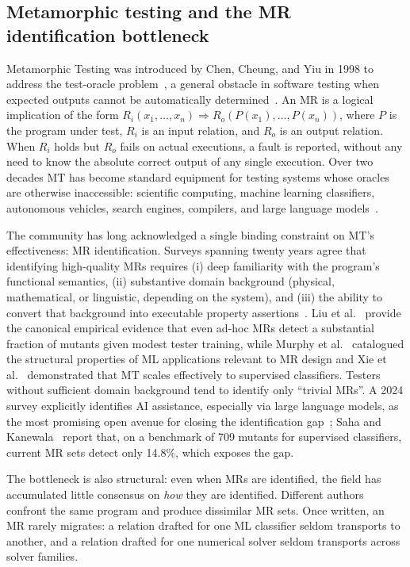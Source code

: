 \documentclass[acmsmall,screen,review]{acmart}
\begin{document}
\subsection{Metamorphic testing and the MR identification bottleneck}

Metamorphic Testing was introduced by Chen, Cheung, and Yiu in 1998 to address the test-oracle problem~\cite{Chen1998}, a general obstacle in software testing when expected outputs cannot be automatically determined~\cite{Barr2015OracleProblem}. An MR is a logical implication of the form $R_i(x_1,\dots,x_n) \Rightarrow R_o(P(x_1),\dots,P(x_n))$, where $P$ is the program under test, $R_i$ is an input relation, and $R_o$ is an output relation. When $R_i$ holds but $R_o$ fails on actual executions, a fault is reported, without any need to know the absolute correct output of any single execution. Over two decades MT has become standard equipment for testing systems whose oracles are otherwise inaccessible: scientific computing, machine learning classifiers, autonomous vehicles, search engines, compilers, and large language models~\cite{Segura2016, LiTOSEM2025}.

The community has long acknowledged a single binding constraint on MT's effectiveness: MR identification. Surveys spanning twenty years agree that identifying high-quality MRs requires (i) deep familiarity with the program's functional semantics, (ii) substantive domain background (physical, mathematical, or linguistic, depending on the system), and (iii) the ability to convert that background into executable property assertions~\cite{Segura2016, LiTOSEM2025}. Liu et al.~\cite{Liu2014MTEffectiveness} provide the canonical empirical evidence that even ad-hoc MRs detect a substantial fraction of mutants given modest tester training, while Murphy et al.~\cite{Murphy2008} catalogued the structural properties of ML applications relevant to MR design and Xie et al.~\cite{Xie2011} demonstrated that MT scales effectively to supervised classifiers. Testers without sufficient domain background tend to identify only ``trivial MRs''. A 2024 survey explicitly identifies AI assistance, especially via large language models, as the most promising open avenue for closing the identification gap~\cite{LiTOSEM2025}; Saha and Kanewala~\cite{Saha2019SupervisedMR} report that, on a benchmark of 709 mutants for supervised classifiers, current MR sets detect only 14.8\%, which exposes the gap.

The bottleneck is also structural: even when MRs are identified, the field has accumulated little consensus on \emph{how} they are identified. Different authors confront the same program and produce dissimilar MR sets. Once written, an MR rarely migrates: a relation drafted for one ML classifier seldom transports to another, and a relation drafted for one numerical solver seldom transports across solver families.
\end{document}

